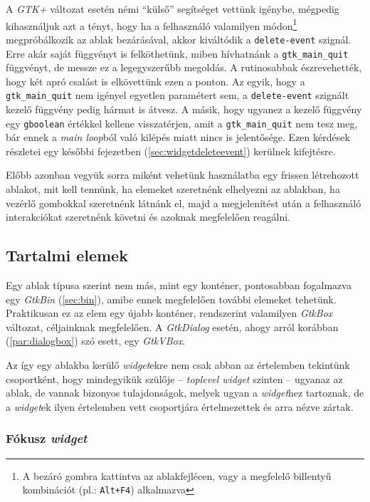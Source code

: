 \label{par:widgetdeleteevent}
A \textit{GTK+} változat esetén némi ``külső'' segítséget vettünk igénybe, mégpedig kihasználjuk azt a tényt, hogy ha a felhasználó valamilyen módon\footnote{A bezáró gombra kattintva az ablakfejlécen, vagy a megfelelő billentyű kombinációt (pl.: \texttt{Alt+F4}) alkalmazva} megpróbálkozik az ablak bezárásával, akkor kiváltódik a \texttt{delete-event} szignál. Erre akár saját függvényt is felköthetünk, miben hívhatnánk a \texttt{gtk\_main\_quit} függvényt, de messze ez a legegyszerűbb megoldás. A rutinosabbak észrevehették, hogy két apró csalást is elkövettünk ezen a ponton. Az egyik, hogy a \texttt{gtk\_main\_quit} nem igényel egyetlen paramétert sem, a \texttt{delete-event} szignált kezelő függvény pedig hármat is átvesz. A másik, hogy ugyanez a kezelő függvény egy \texttt{gboolean} értékkel kellene visszatérjen, amit a \texttt{gtk\_main\_quit} nem tesz meg, bár ennek a \textit{main loop}ból való kilépés miatt nincs is jelentősége. Ezen kérdések részletei egy későbbi fejezetben (\ref{sec:widgetdeleteevent}) kerülnek kifejtésre.

Előbb azonban vegyük sorra miként vehetünk használatba egy frissen létrehozott ablakot, mit kell tennünk, ha elemeket szeretnénk elhelyezni az ablakban, ha vezérlő gombokkal szeretnénk látnánk el, majd a megjelenítést után a felhasználó interakciókat szeretnénk követni és azoknak megfelelően reagálni.

\subsection{Tartalmi elemek}

Egy ablak típusa szerint nem más, mint egy konténer, pontosabban fogalmazva egy \textit{GtkBin} (\ref{sec:bin}), amibe ennek megfelelően további elemeket tehetünk. Praktikusan ez az elem egy újabb konténer, rendszerint valamilyen \textit{GtkBox} változat, céljainknak megfelelően. A \textit{GtkDialog} esetén, ahogy arról korábban (\ref{par:dialogbox}) szó esett, egy \textit{GtkVBox}.

Az így egy ablakba kerülő \textit{widget}ekre nem csak abban az értelemben tekintünk csoportként, hogy mindegyikük szülője -- \textit{toplevel widget} szinten -- ugyanaz az ablak, de vannak bizonyos tulajdonságok, melyek ugyan a \textit{widget}hez tartoznak, de a \textit{widget}ek ilyen értelemben vett csoportjára értelmezettek és arra nézve zártak.

\subsubsection{Fókusz \textit{widget}}
\label{sec:widgetfocus}

